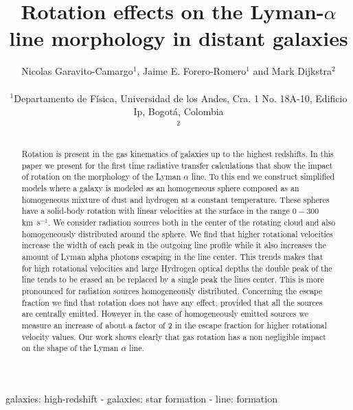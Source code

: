 \documentclass[usenatbib]{mn2e}
\newcommand{\kms}{\,km~s$^{-1}$}
\begin{document}
\title[Rotation in the Lyman-$\alpha$ line]{Rotation effects on the
  Lyman-$\alpha$ line morphology in distant galaxies}
\author[N. Garavito and J.E. Forero-Romero]{
\parbox[t]{\textwidth}{\raggedright 
  Nicolas Garavito-Camargo$^{1}$,
  Jaime E. Forero-Romero$^{1}$ and 
  Mark Dijkstra$^2$
}
\vspace*{6pt}\\
$^{1}$Departamento de F\'{i}sica, Universidad de los Andes, Cra. 1
No. 18A-10, Edificio Ip, Bogot\'a, Colombia \\
$^2$
}
\maketitle

\begin{abstract}
Rotation is present in the gas kinematics of galaxies up to the
highest redshifts. In this paper we present for the first time
radiative transfer calculations that show the impact of rotation on
the morphology of the Lyman $\alpha$ line. To this end we construct
simplified models where a galaxy is modeled as an homogeneous sphere
composed as an homogeneous mixture of dust and hydrogen at a constant
temperature. These spheres have a solid-body rotation with linear
velocities at the surface in the range $0-300$ \kms. We consider
radiation sources both in the center of the rotating cloud and also
homogeneously distributed around the sphere. We find that higher
rotational velocities increase the width of each peak in the outgoing
line profile while it also increases the amount of Lyman alpha photons
escaping in the line center. This trends makes that for high
rotational velocities and large Hydrogen optical depths the double
peak of the line tends to be erased an be replaced by a single peak the
lines center. This is more pronounced for radiation sources
homogeneously distributed. Concerning the escape fraction we find that
rotation does not have any effect, provided that all the sources are
centrally emitted. However in the case of homogeneously emitted
sources we measure an increase of about a factor of $2$ in the escape
fraction for higher rotational velocity values. 
Our work shows clearly that gas rotation has a non
negligible impact on the shape of the Lyman $\alpha$ line.
\end{abstract}
\begin{keywords}
galaxies: high-redshift - galaxies: star formation - line: formation
\end{keywords}
\end{document}
